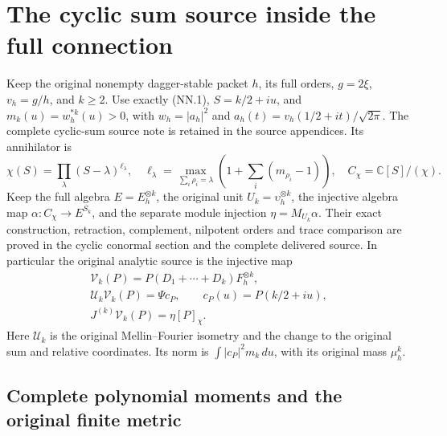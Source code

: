 \section{The cyclic sum source inside the full connection}
\label{sec:cyclic-sum-metric-connection}

Keep the original nonempty dagger-stable packet \(h\), its full orders,
\(g=2\xi\), \(v_h=g/h\), and \(k\ge2\). Use exactly (NN.1),
\(S=k/2+iu\), and \(m_k(u)=w_h^{*k}(u)>0\), with
\(w_h=|a_h|^2\) and \(a_h(t)=v_h(1/2+it)/\sqrt{2\pi}\).
The complete cyclic-sum source note is retained in the source appendices.
Its annihilator is
\[
 \chi(S)=\prod_\lambda(S-\lambda)^{\ell_\lambda},\quad
 \ell_\lambda=\max_{\sum_i\rho_i=\lambda}
               \left(1+\sum_i(m_{\rho_i}-1)\right),\quad
 C_\chi=\mathbb C[S]/(\chi).
 \tag{CM.1}
\]
Keep the full algebra \(E=E_h^{\otimes k}\), the original unit
\(U_k=\upsilon_h^{\otimes k}\), the injective algebra map
\(\alpha:C_\chi\to E^{S_k}\), and the separate module injection
\(\eta=M_{U_k}\alpha\). Their exact construction, retraction,
complement, nilpotent orders and trace comparison are proved in the
cyclic conormal section and the complete delivered source. In particular
the original analytic source is the injective map
\[
 \begin{gathered}
 \mathcal V_k(P)=P(D_1+\cdots+D_k)F_h^{\otimes k},\\
 \mathscr U_k\mathcal V_k(P)=\Psi c_P,\qquad
 c_P(u)=P(k/2+iu),\\
 J^{(k)}\mathcal V_k(P)=\eta[P]_\chi.
 \end{gathered}
 \tag{CM.2}
\]
Here \(\mathscr U_k\) is the original Mellin--Fourier isometry and
the change to the original sum and relative coordinates. Its norm is
\(\int |c_P|^2m_k\,du\), with its original mass \(\mu_h^k\).

\subsection{Complete polynomial moments and the original finite metric}

